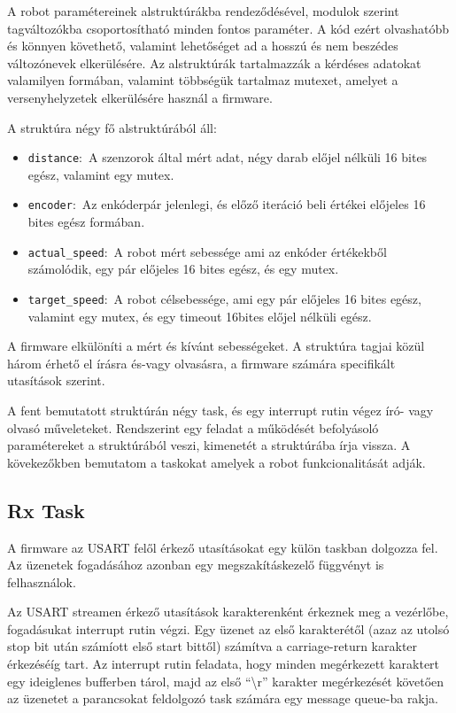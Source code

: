 A robot paramétereinek alstruktúrákba rendeződésével, modulok szerint
tagváltozókba csoportosítható minden fontos paraméter. A kód ezért olvashatóbb és
könnyen követhető, valamint lehetőséget ad a hosszú és nem beszédes változónevek
elkerülésére. Az alstruktúrák tartalmazzák a kérdéses adatokat valamilyen
formában, valamint többségük tartalmaz mutexet, amelyet a versenyhelyzetek
elkerülésére használ a firmware.

A struktúra négy fő alstruktúrából áll:
\begin{itemize}
\item{\verb|distance|:~A szenzorok által mért adat, négy darab előjel nélküli 16
  bites egész, valamint egy mutex.}
\item{\verb|encoder|:~Az enkóderpár jelenlegi, és előző iteráció beli értékei
  előjeles 16 bites egész formában.}
\item{\verb|actual_speed|:~A robot mért sebessége ami az enkóder értékekből
  számolódik, egy pár előjeles 16 bites egész, és egy mutex.}
\item{\verb|target_speed|:~A robot célsebessége, ami egy pár előjeles 16 bites
  egész, valamint egy mutex, és egy timeout 16bites előjel nélküli egész.}
\end{itemize}

A firmware elkülöníti a mért és kívánt sebességeket. A struktúra tagjai
közül három érhető el írásra és-vagy olvasásra, a firmware számára specifikált
utasítások szerint.

\medskip

A fent bemutatott struktúrán négy task, és egy interrupt rutin végez író- vagy
olvasó műveleteket. Rendszerint egy feladat a működését befolyásoló paramétereket
a struktúrából veszi, kimenetét a struktúrába írja vissza. A kövekezőkben
bemutatom a taskokat amelyek a robot funkcionalitását adják.

\subsection{Rx Task}

A firmware az USART felől érkező utasításokat egy külön taskban dolgozza fel. Az
üzenetek fogadásához azonban egy megszakításkezelő függvényt is felhasználok.

Az USART streamen érkező utasítások karakterenként érkeznek meg a vezérlőbe,
fogadásukat interrupt rutin végzi. Egy üzenet az első karakterétől (azaz az
utolsó stop bit után számíott első start bittől) számítva a carriage-return
karakter érkezéséíg tart. Az interrupt rutin feladata, hogy minden megérkezett
karaktert egy ideiglenes bufferben tárol, majd az első ``\textbackslash{}r'' karakter
megérkezését követően az üzenetet a parancsokat feldolgozó task számára egy
message queue-ba rakja. 

